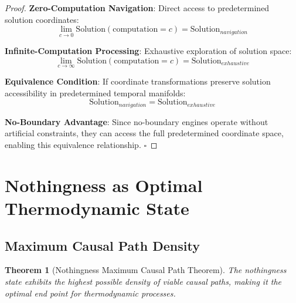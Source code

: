 \documentclass[11pt,a4paper]{article}
\newtheorem{theorem}{Theorem}[section]
\theoremstyle{remark}
\begin{document}
\begin{proof}
\textbf{Zero-Computation Navigation}: Direct access to predetermined solution coordinates:
\begin{equation}
\lim_{c \to 0} \text{Solution}(\text{computation} = c) = \text{Solution}_{navigation}
\end{equation}

\textbf{Infinite-Computation Processing}: Exhaustive exploration of solution space:
\begin{equation}
\lim_{c \to \infty} \text{Solution}(\text{computation} = c) = \text{Solution}_{exhaustive}
\end{equation}

\textbf{Equivalence Condition}: If coordinate transformations preserve solution accessibility in predetermined temporal manifolds:
\begin{equation}
\text{Solution}_{navigation} = \text{Solution}_{exhaustive}
\end{equation}

\textbf{No-Boundary Advantage}: Since no-boundary engines operate without artificial constraints, they can access the full predetermined coordinate space, enabling this equivalence relationship. $\square$
\end{proof}

\section{Nothingness as Optimal Thermodynamic State}

\subsection{Maximum Causal Path Density}

\begin{theorem}[Nothingness Maximum Causal Path Theorem]
The nothingness state exhibits the highest possible density of viable causal paths, making it the optimal end point for thermodynamic processes.
\end{theorem}
\end{document}
